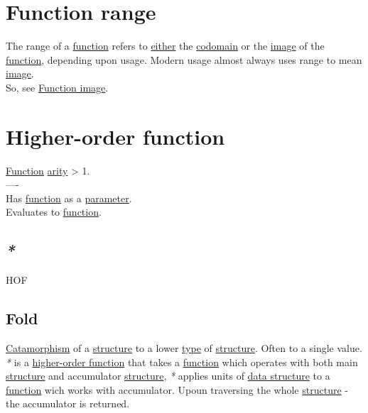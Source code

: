 \documentclass[a4paper,14pt,oneside]{book}
\begin{document}
\section{\label{org2d08b11}Function range}
\label{sec:orgc202776}
The range of a \hyperref[org8cc2ae4]{function} refers to \hyperref[org260eea7]{either} the \hyperref[org71c95ef]{codomain} or the \hyperref[orga531a2e]{image} of the \hyperref[org8cc2ae4]{function}, depending upon usage. Modern usage almost always uses range to mean \hyperref[orga531a2e]{image}.\\
So, see \hyperref[org7c139ac]{Function image}.\\

\section{\label{orgd4bfcfd}Higher-order function}
\label{sec:org8fdebcf}
\hyperref[org8cc2ae4]{Function} \hyperref[org7bee5cc]{arity} > 1.\\

----\\

Has \hyperref[org8cc2ae4]{function} as a \hyperref[orged2015b]{parameter}.\\
Evaluates to \hyperref[org8cc2ae4]{function}.\\

\subsection{\emph{*}}
\label{sec:orgae73368}

\label{org132a751}HOF\\

\subsection{\label{org06ab7f1}Fold}
\label{sec:org5d5d0b8}
\hyperref[org0780825]{Catamorphism} of a \hyperref[orgc940043]{structure} to a lower \hyperref[orgd6db20c]{type} of \hyperref[orgc940043]{structure}. Often to a single value.\\

\emph{*} is a \hyperref[orgd4bfcfd]{higher-order function} that takes a \hyperref[org8cc2ae4]{function} which operates with both main \hyperref[orgc940043]{structure} and accumulator \hyperref[orgc940043]{structure}, \emph{*} applies units of \hyperref[org6c75d51]{data structure} to a \hyperref[org8cc2ae4]{function} wich works with accumulator. Upoun traversing the whole \hyperref[orgc940043]{structure} - the accumulator is returned.\\
\end{document}
